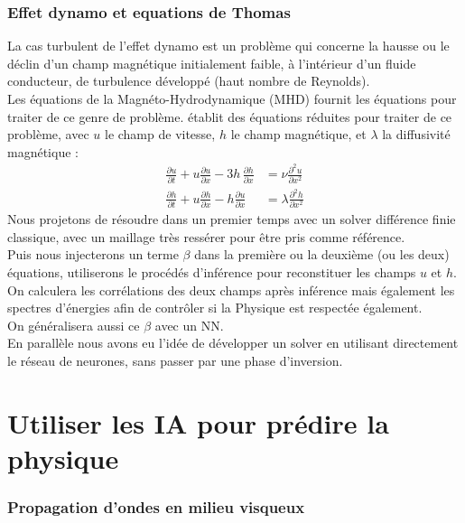 \documentclass[a4paper,12pt]{article}
\newcommand\bk{\color{black}}
\newcommand\brick{\color{brick}}
\newcommand\navy{\color{navy}}
\newcommand\dsb{\color{dsb}}
\numberwithin{equation}{section} %
\begin{document}
\dsb \subsubsection{Effet dynamo et equations de Thomas} \bk
La cas turbulent de l'effet dynamo est un problème qui concerne la hausse ou le déclin d'un champ magnétique initialement faible, à l'intérieur d'un fluide conducteur, de turbulence développé (haut nombre de Reynolds).\\
Les équations de la Magnéto-Hydrodynamique (MHD) fournit les équations pour traiter de ce genre de problème. \cite{thomas1968numerical} établit des équations réduites pour traiter de ce problème, avec $u$ le champ de vitesse, $h$ le champ magnétique, et $\lambda$ la diffusivité magnétique : 
\begin{align}
\frac{\partial u}{\partial t} + u \frac{\partial u}{\partial x} -3h\, \frac{\partial h}{\partial x} &= \nu \frac{\partial^2 u}{\partial x^2} \label{uthomas} \\[3mm]
\frac{\partial h}{\partial t} + u \frac{\partial h}{\partial x} - h \frac{\partial u}{\partial x} &= \lambda \frac{\partial^2 h}{\partial x^2} 
\end{align}
Nous projetons de résoudre dans un premier temps avec un solver différence finie classique, avec un maillage très ressérer pour être pris comme référence.\\
Puis nous injecterons un terme $\beta$ dans la première ou la deuxième (ou les deux) équations, utiliserons le procédés d'inférence pour reconstituer les champs $u$ et $h$.\\ On calculera les corrélations des deux champs après inférence mais également les spectres d'énergies afin de contrôler si la Physique est respectée également.\\

On généralisera aussi ce $\beta$ avec un NN. \\

En parallèle nous avons eu l'idée de développer un solver en utilisant directement le réseau de neurones, sans passer par une phase d'inversion.\\


\navy \section{Utiliser les IA pour prédire la physique} \bk
\brick \subsubsection{Propagation d'ondes en milieu visqueux}\bk
\end{document}
